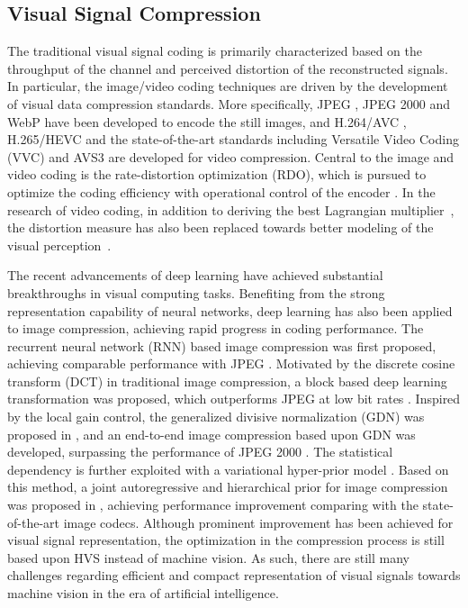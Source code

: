 \documentclass[transmag]{IEEEtran}
\begin{document}
\subsection{Visual Signal Compression}%
The traditional visual signal coding is primarily characterized based on the throughput of the channel and perceived distortion
of the reconstructed signals. 
In particular, the image/video coding techniques are driven by the development of visual data compression standards. 
More specifically, JPEG \cite{wallace1992jpeg}, JPEG 2000 \cite{rabbani2002jpeg2000} and WebP \cite{lian2012webp} have been developed to encode the still images, and H.264/AVC \cite{wiegand2003overview}, H.265/HEVC \cite{sullivan2012overview} and the state-of-the-art standards including Versatile Video Coding (VVC) \cite{choi2019design} and AVS3 \cite{zhang2019recent} are developed for video compression. Central to the image and video coding is the rate-distortion optimization (RDO), which is pursued to optimize the coding efficiency with operational control of the encoder \cite{ramchandran1994rate, sullivan1998rate, stankowski2015rate,karczewicz2008rate}. In the research of video coding, in addition to deriving the best Lagrangian multiplier~\cite{li2008laplace}, the distortion measure has also been replaced towards better modeling of the visual perception~\cite{wang2011ssim}. 

The recent advancements of deep learning have achieved substantial breakthroughs in visual computing tasks. Benefiting from the strong representation capability of neural networks, deep learning has also been applied to image compression, achieving rapid progress in coding performance. The recurrent neural network (RNN) based image compression was first proposed, achieving comparable performance with JPEG \cite{toderici2015variable}. Motivated by the discrete cosine transform (DCT) in traditional image compression, a block based deep learning transformation was proposed, which outperforms JPEG at low bit rates \cite{liu2018cnn}. Inspired by the local gain control, the generalized divisive normalization (GDN) was proposed in \cite{balle2015density}, and an end-to-end image compression based upon GDN was developed, surpassing the performance of JPEG 2000 \cite{balle2016end}. The statistical dependency is further exploited with a variational hyper-prior model \cite{balle2018variational}. Based on this method, a joint autoregressive and hierarchical prior for image compression was proposed in \cite{minnen2018joint}, achieving performance improvement comparing with the state-of-the-art image codecs. Although prominent improvement has been achieved for visual signal representation, the optimization in the compression process is still based upon HVS instead of machine vision. As such, there are still 
many challenges regarding efficient and compact representation of visual signals towards machine vision in the era of artificial intelligence.
\end{document}
